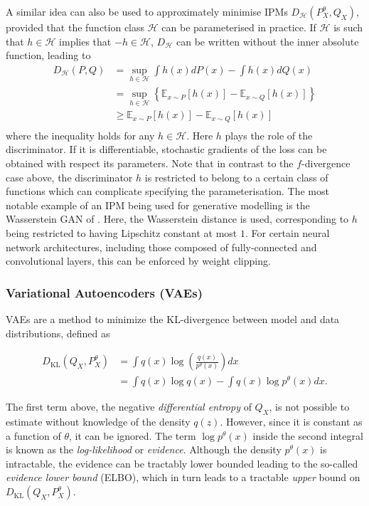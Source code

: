 A similar idea can also be used to approximately minimise IPMs $D_\mathcal{H}(P^\theta_X, Q_X)$, provided that the function class $\mathcal{H}$ can be parameterised in practice.
If $\mathcal{H}$ is such that $h \in \mathcal{H}$ implies that $-h \in \mathcal{H}$, $D_\mathcal{H}$ can be written without the inner absolute function, leading to
%
\begin{align*}
D_{\mathcal{H}}(P, Q) &= \sup_{h\in\mathcal{H}} \int h(x) dP(x) - \int h(x) dQ(x) \\
&= \sup_{h\in\mathcal{H}} \left\{ \mathbb{E}_{x \sim P} \left[ h(x) \right]- \mathbb{E}_{x \sim Q} \left[ h(x) \right] \right\} \\
&\geq  \mathbb{E}_{x \sim P} \left[ h(x) \right]- \mathbb{E}_{x \sim Q} \left[ h(x) \right] \\
\end{align*}
%
where the inequality holds for any $h \in \mathcal{H}$. 
Here $h$ plays the role of the discriminator. 
If it is differentiable, stochastic gradients of the loss can be obtained with respect its parameters.
Note that in contrast to the $f$-divergence case above, the discriminator $h$ is restricted to belong to a certain class of functions which can complicate specifying the parameterisation.
The most notable example of an IPM being used for generative modelling is the Wasserstein GAN of \cite{WGAN}. 
Here, the Wasserstein distance is used, corresponding to $h$ being restricted to having Lipschitz constant at most $1$. 
For certain neural network architectures, including those composed of fully-connected and convolutional layers, this can be enforced by weight clipping.

\subsubsection{Variational Autoencoders (VAEs)}

VAEs \cite{kingma, rezende} are a method to minimize the KL-divergence between model and data distributions, defined as

\begin{align*}
D_{\text{KL}}(Q_X, P^\theta_X) &= \int q(x) \log \left( \frac{q(x)}{p^\theta(x)} \right) dx \\
&= \int q(x) \log q(x) - \int q(x) \log p^\theta(x) dx.
\end{align*}

The first term above, the negative \emph{differential entropy} of $Q_X$, is not possible to estimate without knowledge of the density $q(z)$.
However, since it is constant as a function of $\theta$, it can be ignored.
The term $\log p^\theta(x)$ inside the second integral is known as the \emph{log-likelihood} or \emph{evidence}. 
Although the density $p^\theta(x)$ is intractable, the evidence can be tractably lower bounded leading to the so-called \emph{evidence lower bound} (ELBO), which in turn leads to a tractable \emph{upper} bound on $D_{\text{KL}}(Q_X, P^\theta_X)$. 

